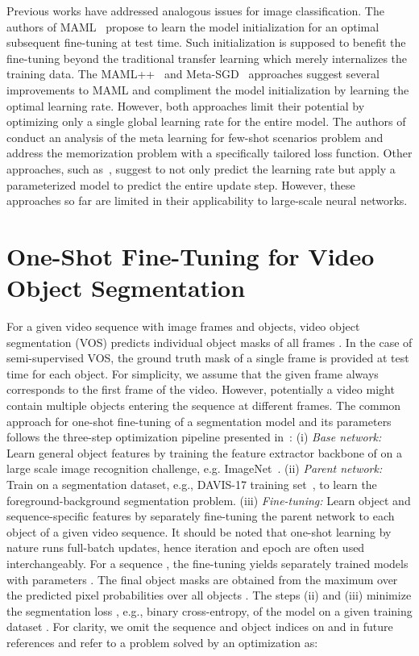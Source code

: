 \documentclass{article}
\begin{document}
Previous works have addressed analogous issues for image classification. The authors of MAML~\cite{MAML} propose to learn the model initialization for an optimal subsequent fine-tuning at test time.
Such initialization is supposed to benefit the fine-tuning beyond the traditional transfer learning which merely internalizes the training data.
The MAML++~\cite{how_train_maml} and Meta-SGD~\cite{Meta-SGD} approaches suggest several improvements to MAML and compliment the model initialization by learning the optimal learning rate.
However, both approaches limit their potential by optimizing only a single global learning rate for the entire model.
The authors of~\cite{memorization} conduct an analysis of the meta learning for few-shot scenarios problem and address the memorization problem with a specifically tailored loss function.
Other approaches, such as~\cite{Ravi2017OptimizationAA}, suggest to not only predict the learning rate but apply a parameterized model to predict the entire update step.
However, these approaches so far are limited in their applicability to large-scale neural networks.
 

\section{One-Shot Fine-Tuning for Video Object Segmentation} \label{sec:osvos}

    For a given video sequence  with  image frames  and  objects, video object segmentation (VOS) predicts individual object masks  of all frames .
In the case of semi-supervised VOS, the ground truth mask  of a single frame is provided at test time for each object.
For simplicity, we assume that the given frame always corresponds to the first frame  of the video.
However, potentially a video might contain multiple objects entering the sequence at different frames.
The common approach for one-shot fine-tuning of a segmentation model  and its parameters  follows the three-step optimization pipeline presented in~\cite{OSVOS}:
(i) {\it Base network:} Learn general object features by training the feature extractor backbone of  on a large scale image recognition challenge, e.g. ImageNet~\cite{imagenet}.
(ii) {\it Parent network:} Train  on a segmentation dataset, e.g., DAVIS-17 training set~\cite{DAVIS17semi}, to learn the foreground-background segmentation problem.
(iii) {\it Fine-tuning:} Learn object and sequence-specific features by separately fine-tuning the parent network to each object of a given video sequence.
It should be noted that one-shot learning by nature runs full-batch updates, hence iteration and epoch are often used interchangeably.
For a sequence , the fine-tuning yields  separately trained models  with parameters .
The final object masks  are obtained from the maximum over the predicted pixel probabilities over all objects .
The steps (ii) and (iii) minimize the segmentation loss , e.g., binary cross-entropy, of the model  on a given training dataset .
For clarity, we omit the sequence and object indices on  and  in future references and refer to a problem solved by an optimization  as:
\end{document}
